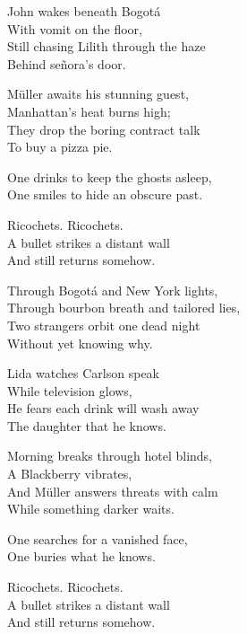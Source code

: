 \begin{lyrics}

John wakes beneath Bogotá\\
With vomit on the floor,\\
Still chasing Lilith through the haze\\
Behind señora’s door.

Müller awaits his stunning guest,\\
Manhattan's heat burns high;\\
They drop the boring contract talk\\
To buy a pizza pie.

 One drinks to keep the ghosts asleep,\\
 One smiles to hide an obscure past.

 Ricochets. %
 Ricochets.\\
A bullet strikes a distant wall\\
And still returns somehow.

 Through Bogotá and New York lights,\\
 Through bourbon breath and tailored lies,\\
Two strangers orbit one dead night\\
Without yet knowing why.

Lida watches Carlson speak\\
While television glows,\\
He fears each drink will wash away\\
The daughter that he knows.

Morning breaks through hotel blinds,\\
A Blackberry vibrates,\\
And Müller answers threats with calm\\
While something darker waits.

 One searches for a vanished face,\\
 One buries what he knows.

 Ricochets. %
 Ricochets.\\
A bullet strikes a distant wall\\
And still returns somehow.


\end{lyrics}
